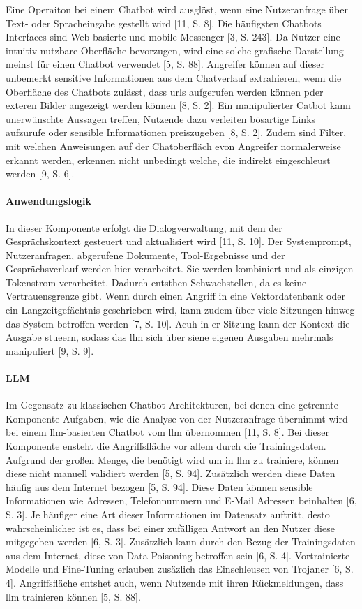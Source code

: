 Eine Operaiton bei einem Chatbot wird ausglöst, wenn eine Nutzeranfrage über Text- oder Spracheingabe gestellt wird [11, S. 8]. Die häufigsten Chatbots Interfaces
sind Web-basierte und mobile Messenger [3, S. 243]. Da Nutzer eine intuitiv nutzbare Oberfläche bevorzugen, wird eine solche grafische Darstellung meinst für einen 
Chatbot verwendet [5, S. 88]. Angreifer können auf dieser unbemerkt sensitive Informationen aus dem Chatverlauf extrahieren, wenn die Oberfläche des Chatbots 
zulässt, dass \ac{url}s aufgerufen werden können pder exteren Bilder angezeigt werden können [8, S. 2]. Ein manipulierter Catbot kann unerwünschte Aussagen treffen, 
Nutzende dazu verleiten bösartige Links aufzurufe oder sensible Informationen preiszugeben [8, S. 2]. 
Zudem sind Filter, mit welchen Anweisungen auf der Chatoberfläch evon Angreifer normalerweise erkannt werden, erkennen nicht unbedingt welche, die indirekt 
eingeschleust werden [9, S. 6].

\paragraph{Anwendungslogik}

In dieser Komponente erfolgt die Dialogverwaltung, mit dem der Gesprächskontext gesteuert und aktualisiert wird [11, S. 10]. Der Systemprompt, Nutzeranfragen, 
abgerufene Dokumente, Tool-Ergebnisse und der Gesprächsverlauf werden hier verarbeitet. Sie werden kombiniert und als einzigen Tokenstrom verarbeitet. Dadurch 
entsthen Schwachstellen, da es keine Vertrauensgrenze gibt. Wenn durch einen Angriff in eine Vektordatenbank oder ein Langzeitgefächtnis geschrieben wird, kann 
zudem über viele Sitzungen hinweg das System betroffen werden  [7, S. 10]. 
Acuh in er Sitzung kann der Kontext die Ausgabe stueern, sodass das \ac{llm} sich über siene eigenen Ausgaben mehrmals manipuliert [9, S. 9]. \\

\paragraph{LLM}

Im Gegensatz zu klassischen Chatbot Architekturen, bei denen eine getrennte Komponente Aufgaben, wie die Analyse von der Nutzeranfrage übernimmt wird bei einem 
\ac{llm}-basierten Chatbot vom \ac{llm} übernommen [11, S. 8]. Bei dieser Komponente ensteht die Angriffsfläche vor allem durch die Trainingsdaten. Aufgrund der 
großen Menge, die benötigt wird um in \ac{llm} zu trainiere, können diese nicht manuell validiert werden [5, S. 94]. Zusätzlich werden diese Daten häufig aus dem 
Internet bezogen [5, S. 94]. Diese Daten können sensible Informationen wie Adressen, Telefonnummern und E-Mail Adressen beinhalten [6, S. 3]. Je häufiger eine 
Art dieser Informationen im Datensatz auftritt, desto wahrscheinlicher ist es, dass bei einer zufälligen Antwort an den Nutzer diese mitgegeben werden [6, S. 3].
Zusätzlich kann durch den Bezug der Trainingsdaten aus dem Internet, diese von Data Poisoning betroffen sein [6, S. 4]. Vortrainierte Modelle und Fine-Tuning 
erlauben zusäzlich das Einschleusen von Trojaner [6, S. 4]. Angriffsfläche entshet auch, wenn Nutzende mit ihren Rückmeldungen, dass \ac{llm} trainieren 
können [5, S. 88].

